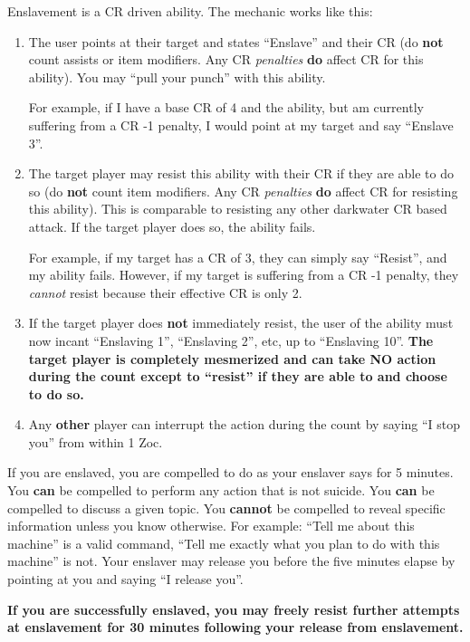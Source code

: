 \documentclass[green]{elementals}
\begin{document}
\name{\gEnslave{}} 

Enslavement is a CR driven ability. The mechanic works like this:

\begin{enumerate}
 \item The user points at their target and states ``Enslave'' and their CR (do {\bf not} count assists or item modifiers. Any CR \emph{penalties} {\bf do} affect CR for this ability). You may ``pull your punch'' with this ability. 
 
 For example, if I have a base CR of 4 and the ability, but am currently suffering from a CR -1 penalty, I would point at my target and say ``Enslave 3''. 
 
 \item The target player may resist this ability with their CR if they are able to do so (do {\bf not} count item modifiers. Any CR \emph{penalties} {\bf do} affect CR for resisting this ability). This is comparable to resisting any other darkwater CR based attack. If the target player does so, the ability fails. 
 
 For example, if my target has a CR of 3, they can simply say ``Resist'', and my ability fails.
 However, if my target is suffering from a CR -1 penalty, they \emph{cannot} resist because their effective CR is only 2.
 
 \item If the target player does {\bf not} immediately resist, the user of the ability must now incant ``Enslaving 1'', ``Enslaving 2'', etc, up to ``Enslaving 10''. {\bf The target player is completely mesmerized and can take NO action during the count except to ``resist'' if they are able to and choose to do so.}
 
 \item Any {\bf other} player can interrupt the action during the count by saying ``I stop you'' from within 1 Zoc.
\end{enumerate}

If you are enslaved, you are compelled to do as your enslaver says for 5 minutes. You {\bf can} be compelled to perform any action that is not suicide. You {\bf can} be compelled  to discuss a given topic. You {\bf cannot} be compelled to reveal specific information unless you know otherwise. For example: ``Tell me about this machine'' is a valid command, ``Tell me exactly what you plan to do with this machine'' is not. Your enslaver may release you before the five minutes elapse by pointing at you and saying ``I release you''.

{\bf If you are successfully enslaved, you may freely resist further attempts at enslavement for 30 minutes following your release from enslavement.}
\end{document}
